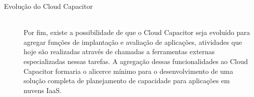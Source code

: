 \begin{description}
\item[Evolução do Cloud Capacitor] \hfill \\
Por fim, existe a possibilidade de que o Cloud Capacitor seja evoluído para agregar
funções de implantação e avaliação de aplicações, atividades que hoje são 
realizadas através de chamadas a ferramentas externas especializadas nessas 
tarefas. A agregação dessas funcionalidades ao Cloud Capacitor formaria o alicerce
mínimo para o desenvolvimento de uma solução completa de planejamento de capacidade 
para aplicações em nuvens IaaS.

\end{description}


